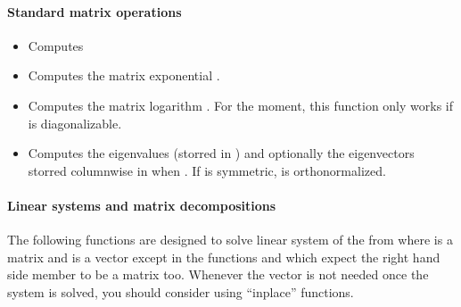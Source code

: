 \paragraph{Standard matrix operations}
\begin{itemize}

\item {}
  \sshortdescribe Computes 

  
\item {}
  \sshortdescribe Computes the matrix exponential .

\item {}
  \sshortdescribe Computes the matrix logarithm . For the
  moment, this function only works if  is diagonalizable.

\item {}
  \sshortdescribe Computes the eigenvalues (storred in ) and optionally
  the eigenvectors storred columnwise in  when
  . If  is symmetric,  is orthonormalized.
\end{itemize}

\paragraph{Linear systems and matrix decompositions}

The following functions are designed to solve linear system of the from  where  is a matrix and  is a vector except in the
functions  and 
which expect the right hand side member to be a matrix too. Whenever the
vector  is not needed once the system is solved, you should consider
using ``inplace'' functions.

